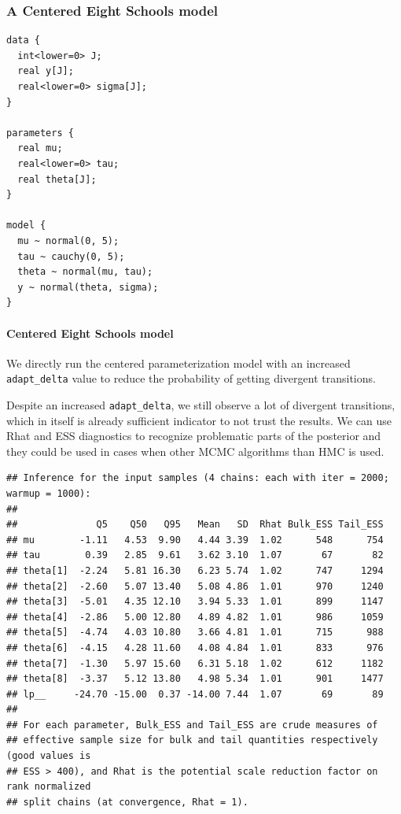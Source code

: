 \documentclass[american,]{article}
\let\oldparagraph\paragraph
\renewcommand{\paragraph}[1]{\oldparagraph{#1}\mbox{}}
\begin{document}
\hypertarget{a-centered-eight-schools-model}{%
\subsubsection{A Centered Eight Schools
model}\label{a-centered-eight-schools-model}}

\begin{verbatim}
data {
  int<lower=0> J;
  real y[J];
  real<lower=0> sigma[J];
}

parameters {
  real mu;
  real<lower=0> tau;
  real theta[J];
}

model {
  mu ~ normal(0, 5);
  tau ~ cauchy(0, 5);
  theta ~ normal(mu, tau);
  y ~ normal(theta, sigma);
}
\end{verbatim}

\hypertarget{centered-eight-schools-model}{%
\paragraph{Centered Eight Schools
model}\label{centered-eight-schools-model}}

We directly run the centered parameterization model with an increased
\texttt{adapt\_delta} value to reduce the probability of getting
divergent transitions.

Despite an increased \texttt{adapt\_delta}, we still observe a lot of
divergent transitions, which in itself is already sufficient indicator
to not trust the results. We can use Rhat and ESS diagnostics to
recognize problematic parts of the posterior and they could be used in
cases when other MCMC algorithms than HMC is used.

\begin{verbatim}
## Inference for the input samples (4 chains: each with iter = 2000; warmup = 1000):
## 
##              Q5    Q50   Q95   Mean   SD  Rhat Bulk_ESS Tail_ESS
## mu        -1.11   4.53  9.90   4.44 3.39  1.02      548      754
## tau        0.39   2.85  9.61   3.62 3.10  1.07       67       82
## theta[1]  -2.24   5.81 16.30   6.23 5.74  1.02      747     1294
## theta[2]  -2.60   5.07 13.40   5.08 4.86  1.01      970     1240
## theta[3]  -5.01   4.35 12.10   3.94 5.33  1.01      899     1147
## theta[4]  -2.86   5.00 12.80   4.89 4.82  1.01      986     1059
## theta[5]  -4.74   4.03 10.80   3.66 4.81  1.01      715      988
## theta[6]  -4.15   4.28 11.60   4.08 4.84  1.01      833      976
## theta[7]  -1.30   5.97 15.60   6.31 5.18  1.02      612     1182
## theta[8]  -3.37   5.12 13.80   4.98 5.34  1.01      901     1477
## lp__     -24.70 -15.00  0.37 -14.00 7.44  1.07       69       89
## 
## For each parameter, Bulk_ESS and Tail_ESS are crude measures of 
## effective sample size for bulk and tail quantities respectively (good values is 
## ESS > 400), and Rhat is the potential scale reduction factor on rank normalized
## split chains (at convergence, Rhat = 1).
\end{verbatim}
\end{document}
